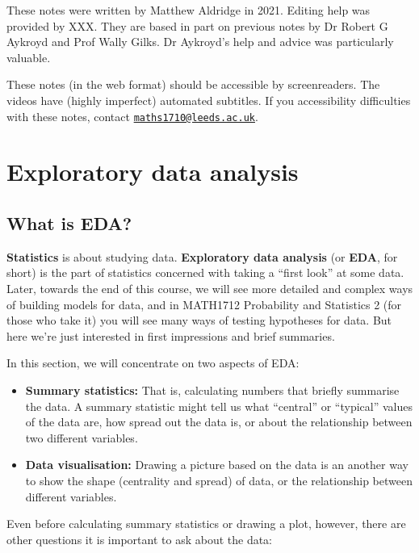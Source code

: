 \documentclass[
  a4paper,
]{book}
\providecommand{\tightlist}{%
  \setlength{\itemsep}{0pt}\setlength{\parskip}{0pt}}
\theoremstyle{definition}
\theoremstyle{definition}
\theoremstyle{definition}
\theoremstyle{remark}
\begin{document}
These notes were written by Matthew Aldridge in 2021. Editing help was provided by XXX. They are based in part on previous notes by Dr Robert G Aykroyd and Prof Wally Gilks. Dr Aykroyd's help and advice was particularly valuable.

These notes (in the web format) should be accessible by screenreaders. The videos have (highly imperfect) automated subtitles. If you accessibility difficulties with these notes, contact \href{mailto:maths1710@leeds.ac.uk}{\nolinkurl{maths1710@leeds.ac.uk}}.

\hypertarget{S01-eda}{%
\chapter{Exploratory data analysis}\label{S01-eda}}

\hypertarget{what-is-eda}{%
\section{What is EDA?}\label{what-is-eda}}

\textbf{Statistics} is about studying data. \textbf{Exploratory data analysis} (or \textbf{EDA}, for short) is the part of statistics concerned with taking a ``first look'' at some data. Later, towards the end of this course, we will see more detailed and complex ways of building models for data, and in MATH1712 Probability and Statistics 2 (for those who take it) you will see many ways of testing hypotheses for data. But here we're just interested in first impressions and brief summaries.

In this section, we will concentrate on two aspects of EDA:

\begin{itemize}
\tightlist
\item
  \textbf{Summary statistics:} That is, calculating numbers that briefly summarise the data. A summary statistic might tell us what ``central'' or ``typical'' values of the data are, how spread out the data is, or about the relationship between two different variables.
\item
  \textbf{Data visualisation:} Drawing a picture based on the data is an another way to show the shape (centrality and spread) of data, or the relationship between different variables.
\end{itemize}

Even before calculating summary statistics or drawing a plot, however, there are other questions it is important to ask about the data:
\end{document}
